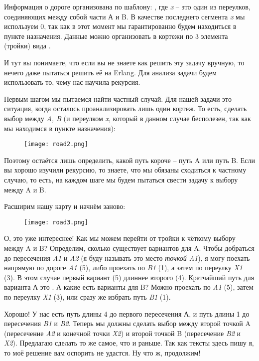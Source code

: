 Информация о дороге организована по шаблону:
, где \emph{x} \--- это один из переулков, соединяющих между собой части А и B.
В качестве последнего сегмента \emph{x} мы используем 0, так как в этот момент мы гарантированно будем находиться в пункте назначения.
Данные можно организовать в кортежи по 3 элемента (тройки) вида .

И тут вы понимаете, что если вы не знаете как решить эту задачу вручную, то нечего даже пытаться решить её на Erlang.
Для анализа задачи будем использовать то, чему нас научила рекурсия.

Первым шагом мы пытаемся найти частный случай.
Для нашей задачи это ситуация, когда осталось проанализировать лишь один кортеж.
То есть, сделать выбор между \emph{A, B} (и переулком \emph{x}, который в данном случае бесполезен, так как мы находимся в пункте назначения):
\begin{figure}[h!]
    \centering
    \texttt{[image: road2.png]}
\end{figure}

Поэтому остаётся лишь определить, какой путь короче \--- путь A или путь B.
Если вы хорошо изучили рекурсию, то знаете, что мы обязаны сходиться к частному случаю, то есть, на каждом шаге мы будем пытаться свести задачу к выбору между A и B.

Расширим нашу карту и начнём заново:
\begin{figure}[h!]
    \centering
    \texttt{[image: road3.png]}
\end{figure}

О, это уже интереснее!
Как мы можем перейти от тройки  к чёткому выбору между A и B?
Определим, сколько существует вариантов для A.
Чтобы добраться до пересечения \emph{A1} и \emph{A2} (я буду называть это место \emph{точкой A1}), я могу поехать напрямую по дороге \emph{A1} (5), либо проехать по \emph{B1} (1), а затем по переулку \emph{X1} (3).
В этом случае первый вариант (5) длиннее второго (4).
Кратчайший путь для варианта А это \ops{[B, X]}.
А какие есть варианты для B?
Можно проехать по \emph{A1} (5), затем по переулку \emph{X1} (3), или сразу же избрать путь \emph{B1} (1).

Хорошо!
У нас есть путь длины 4 \ops{[B, X]} до первого пересечения А, и путь длины 1 \ops{[B]} до пересечения \emph{B1} и \emph{B2}.
Теперь мы должны сделать выбор между второй точкой A (пересечение \emph{A2} и конечной точки \emph{X2}) и второй точкой B (пересечение \emph{B2} и \emph{X2}).
Предлагаю сделать то же самое, что и раньше.
Так как тексты здесь пишу я, то моё решение вам оспорить не удастся.
Ну что ж, продолжим!


